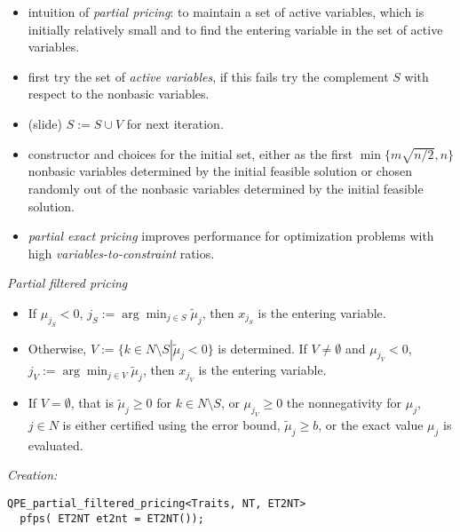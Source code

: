 \documentclass{slides}
\begin{document}
\begin{note}
\begin{itemize}
\item intuition of \emph{partial pricing}: to maintain a set of active
variables, which is initially relatively small and to find the entering
variable in the set of active variables.
\item first try the set of \emph{active variables}, if this fails try the
complement $S$ with respect to the nonbasic variables.
\item (slide) $S:=S \cup V$ for next iteration. 
\item constructor and choices for the initial set, either as the first
$\min\{m\sqrt{n/2},n\}$ nonbasic variables determined by the initial feasible
solution or chosen randomly out of the nonbasic variables determined by the
initial feasible solution. 
\item \emph{partial exact pricing} improves performance for optimization
problems with high \emph{variables-to-constraint} ratios.
\end{itemize}
\end{note}


\begin{slide}
\emph{Partial filtered pricing}

\begin{itemize}
\item If $\mu_{j_{S}} < 0$, $j_{S}:=\arg\min_{j \in S}\tilde{\mu}_{j}$, then
$x_{j_{S}}$ is the entering variable.

\item Otherwise, $V:=\{k \in N \setminus S \left|\right. \tilde{\mu}_{j} <0\}$
is determined. If $V \neq \emptyset$ and $\mu_{j_{V}} <0$,
$j_{V}:=\arg\min_{j \in V}\tilde{\mu}_{j}$, then $x_{j_{V}}$ is the entering
variable.

\item If $V=\emptyset$, that is
$\tilde{\mu}_{j} \geq 0$ for $k \in N \setminus S$, or $\mu_{j_{V}} \geq 0$
the nonnegativity for
$\mu_{j}$, $j \in N$ is
either certified using the error bound, $\tilde{\mu}_{j} \geq b$,
or the exact value $\mu_{j}$ is evaluated.
\end{itemize}

\emph{Creation:}
\begin{verbatim}
QPE_partial_filtered_pricing<Traits, NT, ET2NT>
  pfps( ET2NT et2nt = ET2NT());
\end{verbatim}
\end{slide}
\end{document}
